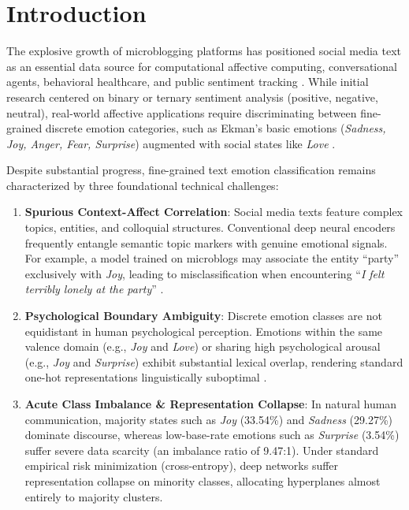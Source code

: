 \documentclass[journal,twocolumn]{article}
\begin{document}
\section{Introduction}
\label{sec:introduction}

The explosive growth of microblogging platforms has positioned social media text as an essential data source for computational affective computing, conversational agents, behavioral healthcare, and public sentiment tracking \cite{saravia2018carer, qi2023sentiment, demszky2020goemotions}. While initial research centered on binary or ternary sentiment analysis (positive, negative, neutral), real-world affective applications require discriminating between fine-grained discrete emotion categories, such as Ekman's basic emotions (\textit{Sadness, Joy, Anger, Fear, Surprise}) augmented with social states like \textit{Love} \cite{saravia2018carer, mohammad2018vad}.

Despite substantial progress, fine-grained text emotion classification remains characterized by three foundational technical challenges:
\begin{enumerate}
    \item \textbf{Spurious Context-Affect Correlation}: Social media texts feature complex topics, entities, and colloquial structures. Conventional deep neural encoders frequently entangle semantic topic markers with genuine emotional signals. For example, a model trained on microblogs may associate the entity ``party'' exclusively with \textit{Joy}, leading to misclassification when encountering ``\textit{I felt terribly lonely at the party}'' \cite{cheng2020club}.
    \item \textbf{Psychological Boundary Ambiguity}: Discrete emotion classes are not equidistant in human psychological perception. Emotions within the same valence domain (e.g., \textit{Joy} and \textit{Love}) or sharing high psychological arousal (e.g., \textit{Joy} and \textit{Surprise}) exhibit substantial lexical overlap, rendering standard one-hot representations linguistically suboptimal \cite{russell1980circumplex, mehrabian1996pleasure}.
    \item \textbf{Acute Class Imbalance \& Representation Collapse}: In natural human communication, majority states such as \textit{Joy} (33.54\%) and \textit{Sadness} (29.27\%) dominate discourse, whereas low-base-rate emotions such as \textit{Surprise} (3.54\%) suffer severe data scarcity (an imbalance ratio of 9.47:1). Under standard empirical risk minimization (cross-entropy), deep networks suffer representation collapse on minority classes, allocating hyperplanes almost entirely to majority clusters.
\end{enumerate}
\end{document}
